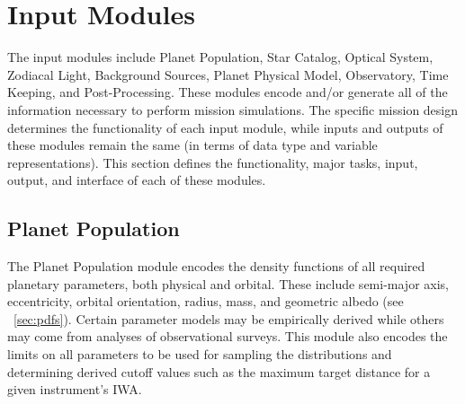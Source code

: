 \documentclass[cleanfoot]{asme2ej}
\begin{document}

\section{Input Modules}\label{sec:modules}
The input modules include Planet Population, Star Catalog, Optical System, Zodiacal Light, Background Sources, Planet Physical Model, Observatory, Time Keeping, and Post-Processing.  These modules encode and/or generate all of the information necessary to perform mission simulations.  The specific mission design determines the functionality of each input module, while inputs and outputs of these modules remain the same (in terms of data type and variable representations).  This section defines the functionality, major tasks, input, output, and interface of each of these modules.


\subsection{Planet Population}
The Planet Population module encodes the density functions of all required planetary parameters, both physical and orbital. These include semi-major axis, eccentricity, orbital orientation, radius, mass, and geometric albedo (see ~\ref{sec:pdfs}). Certain parameter models may be empirically derived while others may come from analyses of observational surveys.  This module also encodes the limits on all parameters to be used for sampling the distributions and determining derived cutoff values such as the maximum target distance for a given instrument's IWA.
\end{document}
